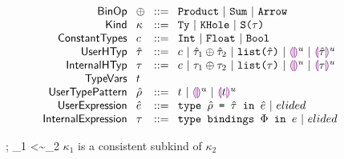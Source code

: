 \documentclass[12pt,letterpaper]{article}
\newcommand{\kconsubkind}[3]{#1 \vdash #2 <\sim #3}
\newcommand{\kindAssign}[3]{#1 \vdash #2 : #3}
\newcommand{\kequiv}[3]{#1 \vdash #2 \equiv #3}
\newcommand{\hPhi}{\Phi}
\newcommand{\hexp}{\hat{e}}
\newcommand{\dexp}{e}
\newcommand{\htau}{\hat{\tau}}
\newcommand{\hkappa}{\kappa}
\newcommand{\dtau}{\tau}
\newcommand{\hrho}{\hat{\rho}}
\newcommand{\Ty}{\textt{Ty}}
\newcommand{\KHole}{\textt{KHole}}
\newcommand{\KSing}[1]{\textt{S(}#1{\textt{)}}}
\newcommand{\hlist}[1]{\textt{list(}#1\textt{)}}
\newcommand{\llparenthesiscolor}{\textcolor{violet}{\llparenthesis}}
\newcommand{\rrparenthesiscolor}{\textcolor{violet}{\rrparenthesis}}
\newcommand{\hthole}[1]{\llparenthesiscolor\rrparenthesiscolor^{#1}}
\newcommand{\hhole}[2]{\llparenthesiscolor#1\rrparenthesiscolor^{#2}}
\newcommand{\htdefine}[3]{\textt{type }#1 \textt{ = } #2\textt{ in }#3}
\newcommand{\dtdefine}[2]{\textt{type bindings } #1 \textt{ in } #2}
\begin{document}
\begin{figure}[t]
	$\arraycolsep=4pt\begin{array}{rllllll}
			\mathsf{BinOp}               & \oplus & ::= &
			\textt{Product} ~\vert~ \textt{Sum} ~\vert~ \textt{Arrow}                                          \\
			\mathsf{Kind}                & \kappa & ::= &
			\Ty ~\vert~ \KHole ~\vert~ \KSing{\tau}                                                            \\
			\mathsf{Constant Types}      & c      & ::= &
			\textt{Int} ~\vert~ \textt{Float} ~\vert~ \textt{Bool}                                             \\
			\mathsf{User HTyp}           & \htau  & ::= &
			c ~\vert~ \htau_1 \oplus \htau_2 ~\vert~ \hlist{\htau} ~\vert~ \hthole{u} ~\vert~ \hhole{\htau}{u} \\
			\mathsf{Internal HTyp}       & \dtau  & ::= &
			c ~\vert~ \dtau_1 \oplus \dtau_2 ~\vert~ \hlist{\dtau} ~\vert~ \hthole{u} ~\vert~ \hhole{\dtau}{u} \\
			\mathsf{Type Vars}           & t      &     &                                                      \\
			\mathsf{User Type Pattern}   & \hrho  & ::= &
			t ~\vert~ \hthole{u} ~\vert~ \hhole{t}{u}                                                          \\
			\mathsf{User Expression}     & \hexp  & ::= &
			\htdefine{\hrho}{\htau}{\hexp} ~\vert~ elided                                                      \\
			\mathsf{Internal Expression} & \dtau  & ::= &
			\dtdefine{\hPhi}{\dexp} ~\vert~ elided                                                             \\
		\end{array}$
\end{figure}


\begin{minipage}{\linewidth}
	\judgbox
	{\kconsubkind{\Delta;\hPhi}{\hkappa_1}{\hkappa_2}}
	{$\hkappa_1$ is a consistent subkind of $\hkappa_2$}
\end{minipage}
\\
\\
\end{document}

